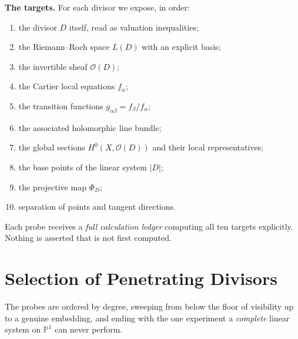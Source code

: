 \documentclass[11pt]{article}
\newcommand{\PP}{\mathbb P}
\newcommand{\OO}{\mathcal O}
\theoremstyle{plain}
\theoremstyle{definition}
\begin{document}
\medskip\noindent\textbf{The targets.}
For each divisor we expose, in order:
\begin{enumerate}
  \item the divisor $D$ itself, read as valuation inequalities;
  \item the Riemann--Roch space $L(D)$ with an explicit basis;
  \item the invertible sheaf $\OO(D)$;
  \item the Cartier local equations $f_\alpha$;
  \item the transition functions $g_{\alpha\beta}=f_\beta/f_\alpha$;
  \item the associated holomorphic line bundle;
  \item the global sections $H^0(X,\OO(D))$ and their local representatives;
  \item the base points of the linear system $|D|$;
  \item the projective map $\Phi_D$;
  \item separation of points and tangent directions.
\end{enumerate}
Each probe receives a \emph{full calculation ledger} computing all ten targets
explicitly. Nothing is asserted that is not first computed.

\section{Selection of Penetrating Divisors}
The probes are ordered by degree, sweeping from below the floor of visibility up
to a genuine embedding, and ending with the one experiment a \emph{complete}
linear system on $\PP^1$ can never perform.
\end{document}
